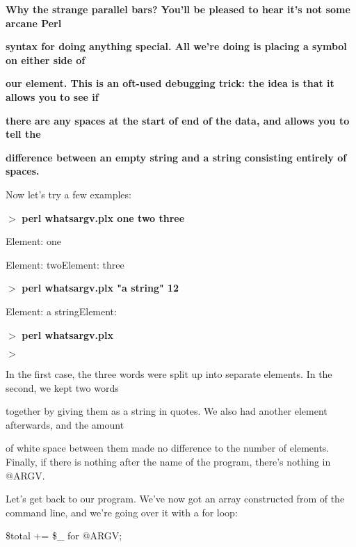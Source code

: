 \documentclass[a4paper,11pt]{book}
\begin{document}
\noindent 

\noindent \textbf{Why the strange parallel bars? You'll be pleased to hear it's not some arcane Perl}

\noindent \textbf{syntax for doing anything special. All we're doing is placing a symbol on either side of}

\noindent \textbf{our element. This is an oft-used debugging trick: the idea is that it allows you to see if}

\noindent \textbf{there are any spaces at the start of end of the data, and allows you to tell the}

\noindent \textbf{difference between an empty string and a string consisting entirely of spaces.}

\noindent 

\noindent 

\noindent Now let's try a few examples:

\noindent 

\noindent $>$ \textbf{perl whatsargv.plx one two three}

\noindent Element: \textbar one\textbar 

\noindent Element: \textbar two\textbar  Element: \textbar three\textbar 

\noindent $>$ \textbf{perl whatsargv.plx "a string" 12}

\noindent Element: \textbar a string\textbar  Element: \textbar 

\noindent $>$ \textbf{perl whatsargv.plx}

\noindent $>$

\noindent 

\noindent 

\noindent In the first case, the three words were split up into separate elements. In the second, we kept two words

\noindent together by giving them as a string in quotes. We also had another element afterwards, and the amount

\noindent of white space between them made no difference to the number of elements. Finally, if there is nothing after the name of the program, there's nothing in @ARGV.

\noindent 

\noindent Let's get back to our program. We've now got an array constructed from of the command line, and we're going over it with a for loop:

\noindent 

\noindent \$total += \$\_  for @ARGV;
\end{document}

